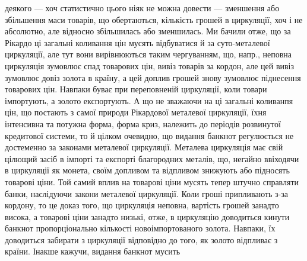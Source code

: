 деякого — хоч статистично цього ніяк не можна довести — зменшення або збільшення
маси товарів, що обертаються, кількість грошей в циркуляції, хоч і не
абсолютно, але відносно збільшилась або зменшилась. Ми бачили отже, що за
Рікардо ці загальні коливання цін мусять відбуватися й за суто-металевої циркуляції,
але тут вони вирівнюються таким чергуванням, що, напр., неповна
циркуляція зумовлює спад товарових цін, вивіз товарів за кордон, але цей вивіз
зумовлює довіз золота в країну, а цей доплив грошей знову зумовлює піднесення
товарових цін. Навпаки буває при переповненій циркуляції, коли товари імпортують,
а золото експортують. А що не зважаючи на ці загальні коливанпя цін,
що постають з самої природи Рікардової металевої циркуляції, їхня інтенсивна
та потужна форма, форма криз, належить до періодів розвинутої кредитової системи,
то й цілком очевидно, що видання банкнот регулюється не достеменно за законами
металевої циркуляції. Металева циркуляція має свій цілющий засіб в імпорті
та експорті благородних металів, що, негайно ввіходячи в циркуляції як монета,
своїм допливом та відпливом знижують або підносять товарові ціни. Той самий
вплив на товарові ціни мусять тепер штучно справляти банки, наслідуючи закони
металевої циркуляції. Коли гроші припливають з-за кордону, то це доказ того,
що циркуляція неповна, вартість грошей занадто висока, а товарові ціни занадто
низькі, отже, в циркуляцію доводиться кинути банкнот пропорціонально кількості
новоімпортованого золота. Навпаки, їх доводиться забирати з циркуляції відповідно
до того, як золото відпливає з країни. Інакше кажучи, видання банкнот мусить
\parbreak{}  %
